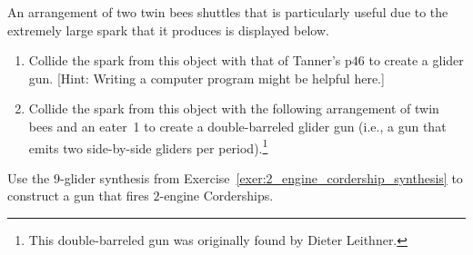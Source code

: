 \begin{multicols}{2}
	
	\mfilbreak
	
	
	\begin{problem}\label{exer:twin_bees_large_spark}
		An arrangement of two twin bees shuttles that is particularly useful due to the extremely large spark that it produces is displayed below.
		
		\begin{center}
		\end{center}
		
		\begin{enumerate}[label=\bf\color{ocre}(\alph*)]
			\item Collide the spark from this object with that of Tanner's p$46$ to create a glider gun. [Hint: Writing a computer program might be helpful here.]
			
			\item Collide the spark from this object with the following arrangement of twin bees and an eater~1 to create a double-barreled glider gun (i.e., a gun that emits two side-by-side gliders per period).\footnote{This double-barreled gun was originally found by Dieter Leithner.}
			
			\begin{center}
			\end{center}
		\end{enumerate}
	\end{problem}
	
	
	\mfilbreak
	
	
	\begin{problem}\label{exer:2eng_corder_gun}
		Use the $9$-glider synthesis from Exercise~\ref{exer:2_engine_cordership_synthesis} to construct a gun that fires $2$-engine Corderships.
	\end{problem}
	

\end{multicols}

